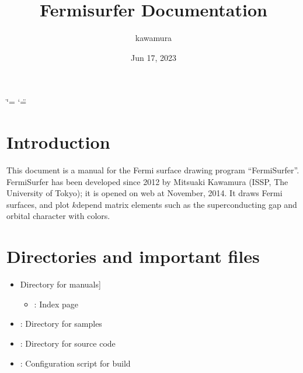 \documentclass[letterpaper,10pt,pdftex,openany,english]{sphinxmanual}
\title{Fermisurfer Documentation}
\date{Jun 17, 2023}
\author{kawamura}
\begin{document}
\ifdefined\shorthandoff
  \ifnum\catcode`\=\string=\active\shorthandoff{=}\fi
  \ifnum\catcode`\"=\active{}\fi
\fi

\pagestyle{empty}
\sphinxmaketitle
\pagestyle{plain}
\sphinxtableofcontents
\pagestyle{normal}
\label{\detokenize{index::doc}}


\sphinxstepscope


\chapter{Introduction}
\label{\detokenize{overview:introduction}}\label{\detokenize{overview::doc}}
\sphinxAtStartPar
This document is a manual for the Fermi surface drawing program
“FermiSurfer”. FermiSurfer has been developed since 2012 by Mitsuaki
Kawamura (ISSP, The University of Tokyo); it is opened on web at
November, 2014. It draws Fermi surfaces, and plot \(k\)\sphinxhyphen{}depend matrix
elements such as the superconducting gap and orbital character with
colors.

\sphinxstepscope


\chapter{Directories and important files}
\label{\detokenize{file:directories-and-important-files}}\label{\detokenize{file::doc}}\begin{itemize}
\item {} \begin{description}
\sphinxlineitem{\sphinxcode{\sphinxupquote{doc/}}}{[}Directory for manuals{]}\begin{itemize}
\item {} 
\sphinxAtStartPar
{} : Index page

\end{itemize}

\end{description}

\item {} 
\sphinxAtStartPar
{} : Directory for samples

\item {} 
\sphinxAtStartPar
{} : Directory for source code

\item {} 
\sphinxAtStartPar
{} : Configuration script for build

\end{itemize}
\end{document}
